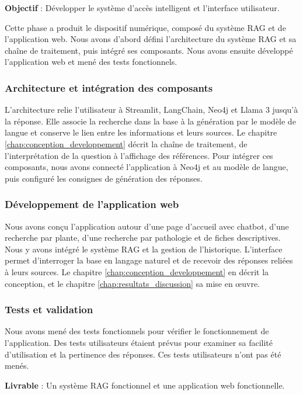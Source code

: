 \textbf{Objectif} : Développer le système d'accès intelligent et l'interface utilisateur.

Cette phase a produit le dispositif numérique, composé du système RAG et de l'application web. Nous avons d'abord défini l'architecture du système RAG et sa chaîne de traitement, puis intégré ses composants. Nous avons ensuite développé l'application web et mené des tests fonctionnels.

\subsubsection{Architecture et intégration des composants}

L'architecture relie l'utilisateur à Streamlit, LangChain, Neo4j et Llama 3 jusqu'à la réponse. Elle associe la recherche dans la base à la génération par le modèle de langue et conserve le lien entre les informations et leurs sources. Le chapitre \ref{chap:conception_developpement} décrit la chaîne de traitement, de l'interprétation de la question à l'affichage des références. Pour intégrer ces composants, nous avons connecté l'application à Neo4j et au modèle de langue, puis configuré les consignes de génération des réponses.

\subsubsection{Développement de l'application web}

Nous avons conçu l'application autour d'une page d'accueil avec chatbot, d'une recherche par plante, d'une recherche par pathologie et de fiches descriptives. Nous y avons intégré le système RAG et la gestion de l'historique. L'interface permet d'interroger la base en langage naturel et de recevoir des réponses reliées à leurs sources. Le chapitre \ref{chap:conception_developpement} en décrit la conception, et le chapitre \ref{chap:resultats_discussion} sa mise en œuvre.

\subsubsection{Tests et validation}

Nous avons mené des tests fonctionnels pour vérifier le fonctionnement de l'application. Des tests utilisateurs étaient prévus pour examiner sa facilité d'utilisation et la pertinence des réponses. Ces tests utilisateurs n'ont pas été menés.

\textbf{Livrable} : Un système RAG fonctionnel et une application web fonctionnelle.

